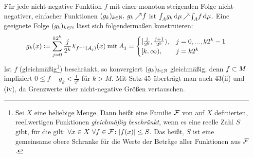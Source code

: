 \documentclass[skript.tex]{subfiles}
\begin{document}
	\begin{bem}
		Für jede nicht-negative Funktion $f$ mit einer monoton steigenden Folge nicht-negativer, einfacher Funktionen $(g_k)_{k\in\mathbb{N}}, \: g_k \kern -1pt \nearrow \kern -2pt f$ ist $ \int_A \! g_k \, \mathrm{d}\mu \kern -1pt \nearrow \kern -2pt \int_A \! f \, \mathrm{d}\mu$. Eine geeignete Folge $(g_k)_{k\in\mathbb{N}}$ lässt sich folgendermaßen konstruieren:
		\begin{equation}
			g_k(x)\ceq \sum_{j=0}^{k2^k}\frac{j}{2^k}\rchi_{f^{-1}(A_j)}(x) \: \mathrm{mit} \:
			A_j=
			\begin{cases}
			[\frac{j}{2^k},\frac{j+1}{2^k}),& j=0,...,k2^k-1  \\
			[k,\infty),& j=k2^k
			\end{cases}
		\end{equation}
		Ist $f$ (gleichmäßig\footnote{Sei $X$ eine beliebige Menge. Dann heißt eine Familie $\mathcal{F}$ von auf $X$ definierten, reellwertigen Funktionen \textit{gleichmäßig beschränkt}, wenn es eine reelle Zahl $S$ gibt, für die gilt: $\forall x \in X\ \forall f \in \mathcal{F}\colon |f(x)| \le S$. Das heißt, $S$ ist eine gemeinsame obere Schranke für die Werte der Beträge aller Funktionen aus $\mathcal{F}$.}) beschränkt, so konvergiert $(g_k)_{k\in\mathbb{N}}$ gleichmäßig, denn $f\subset M$ impliziert $0\leq f-g_k<\frac{1}{2^k}$ für $k>M$.
			Mit \textup{Satz 45} überträgt man auch \textup{43(ii)} und \textup{(iv)}, da Grenzwerte über nicht-negative Größen vertauschen.
	\end{bem}
\end{document}
